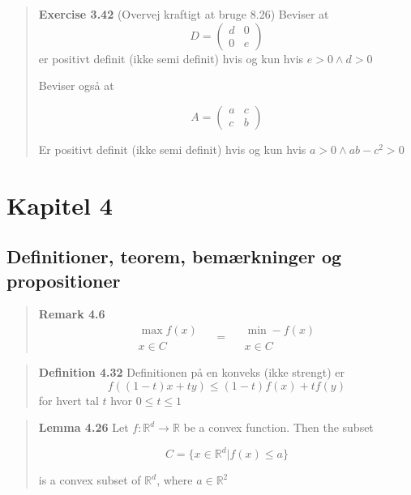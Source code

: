 \documentclass[a4paper, 12pt]{article}
\newcommand{\R}{\mathbb{R}}
\begin{document}
	\begin{quote}
		\textbf{Exercise 3.42} (Overvej kraftigt at bruge 8.26) Beviser at 
		\[ D = \begin{pmatrix}
			d & 0 \\ 0 & e
		\end{pmatrix} \]
		er positivt definit (ikke semi definit) hvis og kun hvis $ e > 0 \land d > 0 $
		
		Beviser også at 
		
		\[ A = \begin{pmatrix}
			a & c \\ c & b
		\end{pmatrix} \]
	
		Er positivt definit (ikke semi definit) hvis og kun hvis $ a > 0 \land ab - c^2 > 0 $
	\end{quote}
	
	\section*{Kapitel 4}

	\subsection{Definitioner, teorem, bemærkninger og propositioner}
	
	\begin{quote}
		\textbf{Remark 4.6} 
		\[ \begin{matrix}
			\max f(x) \\ x \in C
		\end{matrix}\quad  = \quad
		\begin{matrix}
			\min -f(x) \\ x \in C
		\end{matrix}
	\]
	\end{quote}

	\begin{quote}
		\textbf{Definition 4.32} Definitionen på en konveks (ikke strengt) er
		\[ f((1-t)x + ty) \leq (1-t)f(x) + tf(y) \]
		for hvert tal $ t $ hvor $ 0 \leq t \leq 1 $
	\end{quote}
	
	\begin{quote}
		\textbf{Lemma 4.26} Let $ f:\R^d\longrightarrow \R $ be a convex function. Then the subset 
		
		\[ C = \{x \in \R^d | f(x) \leq a\} \]
		
		is a convex subset of $ \R^d $, where $ a \in \R^2 $
	\end{quote}
	
\end{document}
